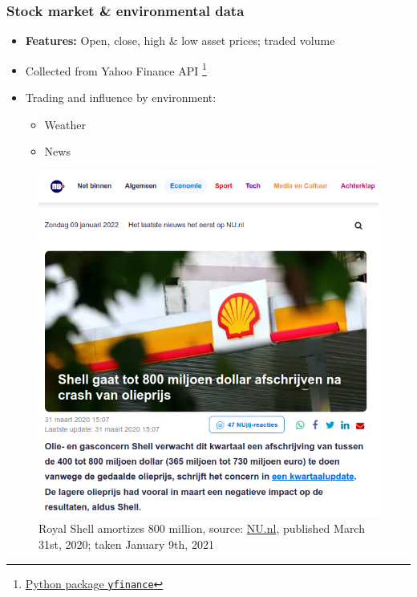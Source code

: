 \documentclass[aspectratio=169,classic]{uva-inf-presentation}
\begin{document}
\begin{frame}
\frametitle{Stock market \& environmental data}
\begin{itemize}
    \item \textbf{Features:} Open, close, high \& low asset prices; traded volume
    \item Collected from Yahoo Finance API \footnote{\href{run:https://pypi.org/project/yfinance/}{Python package \texttt{yfinance}}}
    \item Trading and influence by environment: 
    \begin{itemize}
        \item Weather \cite{hirshleifer2003good}
        \item News \cite{tversky1974judgment, de1985does, veronesi1999stock}
    \end{itemize}
\end{itemize}
\begin{figure}\centering
    \includegraphics[trim=0cm 0cm 0 -6cm, scale=0.25]{images/shell_news_mar2020.png}
    \caption{Royal Shell amortizes 800 million, source: \href{run:https://www.nu.nl/economie/6041609/shell-gaat-tot-800-miljoen-dollar-afschrijven-na-crash-van-olieprijs.html}{NU.nl}, published March 31st, 2020; taken January 9th, 2021}
\end{figure}
\end{frame}
\end{document}
